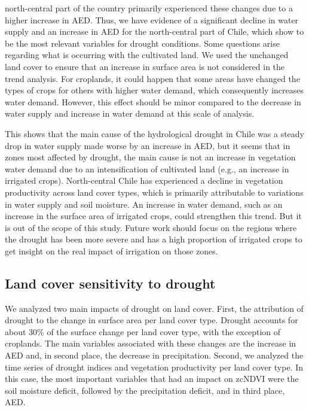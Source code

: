\documentclass[
  authoryear,
  preprint,
  3p,
  onecolumn]{elsarticle}
\begin{document}
north-central part of the country primarily experienced these changes
due to a higher increase in AED. Thus, we have evidence of a significant
decline in water supply and an increase in AED for the north-central
part of Chile, which show to be the most relevant variables for drought
conditions. Some questions arise regarding what is occurring with the
cultivated land. We used the unchanged land cover to ensure that an
increase in surface area is not considered in the trend analysis. For
croplands, it could happen that some areas have changed the types of
crops for others with higher water demand, which consequently increases
water demand. However, this effect should be minor compared to the
decrease in water supply and increase in water demand at this scale of
analysis.

This shows that the main cause of the hydrological drought in Chile was
a steady drop in water supply made worse by an increase in AED, but it
seems that in zones most affected by drought, the main cause is not an
increase in vegetation water demand due to an intensification of
cultivated land (e.g., an increase in irrigated crops). North-central
Chile has experienced a decline in vegetation productivity across land
cover types, which is primarily attributable to variations in water
supply and soil moisture. An increase in water demand, such as an
increase in the surface area of irrigated crops, could strengthen this
trend. But it is out of the scope of this study. Future work should
focus on the regions where the drought has been more severe and has a
high proportion of irrigated crops to get insight on the real impact of
irrigation on those zones.

\hypertarget{land-cover-sensitivity-to-drought}{%
\subsection{Land cover sensitivity to
drought}\label{land-cover-sensitivity-to-drought}}

We analyzed two main impacts of drought on land cover. First, the
attribution of drought to the change in surface area per land cover
type. Drought accounts for about 30\% of the surface change per land
cover type, with the exception of croplands. The main variables
associated with these changes are the increase in AED and, in second
place, the decrease in precipitation. Second, we analyzed the time
series of drought indices and vegetation productivity per land cover
type. In this case, the most important variables that had an impact on
zcNDVI were the soil moisture deficit, followed by the precipitation
deficit, and in third place, AED.
\end{document}
